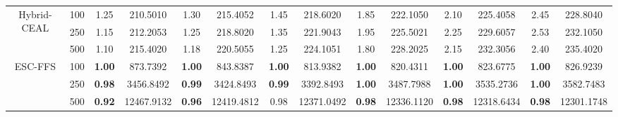 \documentclass[preprint,12pt]{elsarticle}
\begin{document}
\begin{table}[!t]
{\begin{tabular}{cc|cccccccccccc}
 \multirow{3}{*}{Hybrid-CEAL}   &  100    &  1.25          &  210.5010                  &  1.30          &  215.4052                  &  1.45          &  218.6020                  &  1.85          &  222.1050                  &  2.10          &  225.4058                  &  2.45          &  228.8040         \\
                                       &  250    &  1.15          &  212.2053                  &  1.25          &  218.8020                  &  1.35          &  221.9043                  &  1.95          &  225.5021                  &  2.25          &  229.6057                  &  2.53          &  232.1050         \\
                                       &  500    &  1.10          &  215.4020                  &  1.18          &  220.5055                  &  1.25          &  224.1051                  &  1.80          &  228.2025                  &  2.15          &  232.3056                  &  2.40          &  235.4020         \\ \hline

\multirow{3}{*}{ESC-FFS}               & 100    & \textbf{1.00} & 873.7392                  & \textbf{1.00} & 843.8387                  & \textbf{1.00} & 813.9382                  & \textbf{1.00} & 820.4311                  & \textbf{1.00} & 823.6775                  & \textbf{1.00} & 826.9239        \\
                                       & 250    & \textbf{0.98} & 3456.8492                 & \textbf{0.99} & 3424.8493                 & \textbf{0.99} & 3392.8493                 & \textbf{1.00} & 3487.7988                 & \textbf{1.00} & 3535.2736                 & \textbf{1.00} & 3582.7483       \\
                                       & 500    & \textbf{0.92} & 12467.9132                & \textbf{0.96} & 12419.4812                & 0.98          & 12371.0492                & \textbf{0.98} & 12336.1120                & \textbf{0.98} & 12318.6434                & \textbf{0.98} & 12301.1748      \\ \hline


\end{tabular}}
\end{table}
\end{document}
